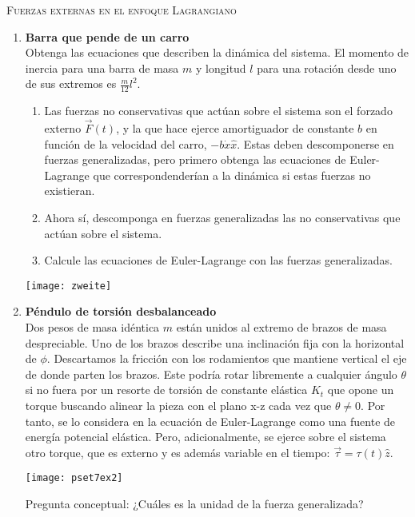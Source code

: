 \documentclass[11pt, spanish, a4paper, twoside]{article}
\begin{document}
\begin{center}
  \textsc{\large Fuerzas externas en el enfoque Lagrangiano}
\end{center}

\begin{enumerate}

\item 
\begin{minipage}[t][8cm]{0.55\textwidth} 
\textbf{Barra que pende de un carro}\\
Obtenga las ecuaciones que describen la dinámica del sistema.
El momento de inercia para una barra de masa \(m\) y longitud \(l\) para una rotación desde uno de sus extremos es \(\frac{m}{12} l^2\). 
\begin{enumerate}
	\item Las fuerzas no conservativas que actúan sobre el sistema son el forzado externo \(\vec{F}(t)\), y la que hace ejerce amortiguador de constante \(b\) en función de la velocidad del carro,  \(- b \dot{x} \hat{x}\).
	Estas deben descomponerse en fuerzas generalizadas, pero primero obtenga las ecuaciones de Euler-Lagrange que correspondenderían a la dinámica si estas fuerzas no existieran.
	\item Ahora sí, descomponga en fuerzas generalizadas las no conservativas que actúan sobre el sistema.
	\item Calcule las ecuaciones de Euler-Lagrange con las fuerzas generalizadas.
\end{enumerate}
\end{minipage}
\begin{minipage}[c][-1cm][t]{0.4\textwidth}
	\texttt{[image: zweite]}
\end{minipage}



\item 
\begin{minipage}[t][5.3cm]{0.6\textwidth}
\textbf{Péndulo de torsión desbalanceado}\\
Dos pesos de masa idéntica $m$ están unidos al extremo de brazos de masa despreciable.
Uno de los brazos describe una inclinación fija con la horizontal de $\phi$.
Descartamos la fricción con los rodamientos que mantiene vertical el eje de donde parten los brazos.
Este podría rotar libremente a cualquier ángulo $\theta$ si no fuera por un resorte de torsión de constante elástica $K_t$ que opone un torque buscando alinear la pieza con el plano x-z cada vez que $\theta \neq 0$.
Por tanto, se lo considera en la ecuación de Euler-Lagrange como una fuente de energía potencial elástica.
Pero, adicionalmente, se ejerce sobre el sistema otro torque, que es externo y es además variable en el tiempo: $\vec{\tau}= \tau (t) \hat{z}$.
\end{minipage}
\begin{minipage}[c][1cm][t]{0.35\textwidth}
	\texttt{[image: pset7ex2]}
\end{minipage}
Pregunta conceptual:
¿Cuáles es la unidad de la fuerza generalizada?


\end{enumerate}
\end{document}

